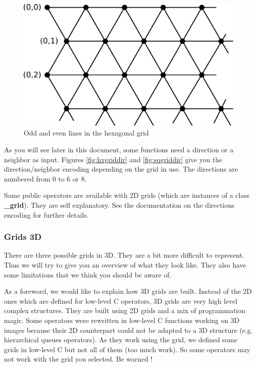 \documentclass[a4paper,10pt,oneside]{article}
\begin{document}
\begin{figure}
\centering
\includegraphics[scale=0.3]{figures/hex_grid.pdf}
\caption{Odd and even lines in the hexagonal grid}
\label{fig:hex_grid}
\end{figure}

As you will see later in this document, some functions need a direction or a 
neighbor as input. Figures \ref{fig:hxgriddir} and \ref{fig:sqgriddir} give you
the direction/neighbor encoding depending on the grid in use. The directions
are numbered from 0 to 6 or 8.

Some public operators are available with 2D grids (which are instances of a class \textbf{\_grid}). They are self
explanatory. See the documentation on the directions encoding for further details.

\subsubsection{Grids 3D}

There are three possible grids in 3D. They are a bit more
difficult to represent. Thus we will try to give you an overview
of what they look like. They also have some limitations that we think you
should be aware of.

As a foreword, we would like to explain how 3D grids are built.
Instead of the 2D ones which are defined for low-level C operators, 3D
grids are very high level complex structures. They are built using 2D grids and
a mix of programmation magic. Some operators were rewritten in low-level C
functions working on 3D images because their 2D counterpart could not be adapted
to a 3D structure (e.g. hierarchical queues operators). As they work using the
grid, we defined some grids in low-level C but not all of them (too much work).
So some operators may not work with the grid you selected. Be warned !
\end{document}
